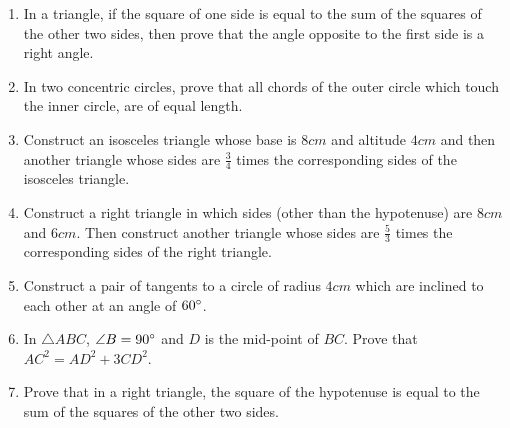 \begin{enumerate}
\item In a triangle, if the square of one side is equal to the sum of the squares of the other two sides, then prove that the angle opposite to the first side is a right angle.

\item In two concentric circles, prove that all chords of the outer circle which touch the inner circle, are of equal length.

\item Construct an isosceles triangle whose base is $8 cm$ and altitude $4 cm$ and then another triangle whose sides are $\frac{3}{4}$ times the corresponding sides of the isosceles triangle.

\item Construct a right triangle in which sides (other than the hypotenuse) are $8 cm$ and $6 cm$. Then construct another triangle whose sides are $\frac{5}{3}$ times the corresponding sides of the right triangle.

\item Construct a pair of tangents to a circle of radius $4 cm$ which are inclined to each other at an angle of $60\degree$.

\item In ${\triangle ABC}$, ${\angle B} = {90\degree}$ and $D$ is the mid-point of $BC$. Prove that ${AC}^2 = {AD}^2 + 3{CD}^2$.

\item Prove that in a right triangle, the square of the hypotenuse is equal to the sum of the squares of the other two sides.

\end{enumerate}
